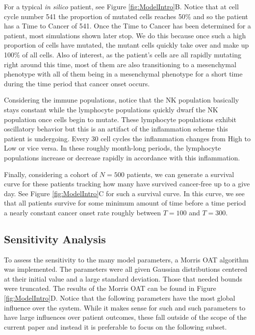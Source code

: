 \documentclass{article}
\begin{document}
For a typical {\it in silico} patient, see Figure \ref{fig:ModelIntro}B.
Notice that at cell cycle number 541 the proportion of mutated cells reaches 50\% and so the patient has a Time to Cancer of 541.
Once the Time to Cancer has been determined for a patient, most simulations shown later stop.
We do this because once such a high proportion of cells have mutated, the mutant cells quickly take over and make up 100\% of all cells.
Also of interest, as the patient's cells are all rapidly mutating right around this time, most of them are also transitioning to a mesenchymal phenotype with all of them being in a mesenchymal phenotype for a short time during the time period that cancer onset occurs.

Considering the immune populations, notice that the NK population basically stays constant while the lymphocyte populations quickly dwarf the NK population once cells begin to mutate.
These lymphocyte populations exhibit oscillatory behavior but this is an artifact of the inflammation scheme this patient is undergoing.
Every 30 cell cycles the inflammation changes from High to Low or vice versa.
In these roughly month-long periods, the lymphocyte populations increase or decrease rapidly in accordance with this inflammation.

Finally, considering a cohort of $N=500$ patients, we can generate a survival curve for these patients tracking how many have survived cancer-free up to a give day.
See Figure \ref{fig:ModelIntro}C for such a survival curve.
In this curve, we see that all patients survive for some minimum amount of time before a time period a nearly constant cancer onset rate roughly between $T = 100$ and $T = 300$.

\subsection{Sensitivity Analysis}\label{SensAnalysis}
To assess the sensitivity to the many model parameters, a Morris OAT algorithm was implemented.
The parameters were all given Gaussian distributions centered at their initial value and a large standard deviation.
Those that needed bounds were truncated.
The results of the Morris OAT can be found in Figure \ref{fig:ModelIntro}D.
Notice that the following parameters have the most global influence over the system.
While it makes sense for such and such parameters to have large influences over patient outcomes, these fall outside of the scope of the current paper and instead it is preferable to focus on the following subset.
\end{document}
